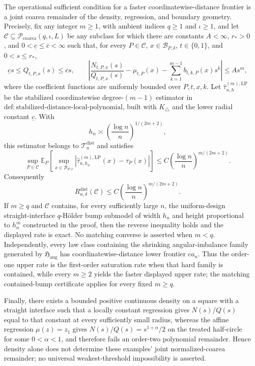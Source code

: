 The operational sufficient condition for a faster coordinatewise-distance frontier is a joint coarea remainder of the density, regression, and boundary geometry.  Precisely, fix any integer \(m\geq1\), with ambient indices \(q\geq1\) and \(\iota\geq1\), and let \(\mathcal C\subseteq\mathcal P_{\mathrm{coarea}}(q,\iota,L)\) be any subclass for which there are constants \(A<\infty\), \(r_*>0\), and \(0<\underline c\leq\overline c<\infty\) such that, for every \(P\in\mathcal C\), \(x\in\mathcal B_{P,\delta}\), \(t\in\{0,1\}\), and \(0<s\leq r_*\),
\[
 \underline c s\leq Q_{t,P,x}(s)\leq\overline c s,
 \qquad
 \left|\frac{N_{t,P,x}(s)}{Q_{t,P,x}(s)}-\mu_{t,P}(x)-\sum_{k=1}^{m-1}b_{t,k,P}(x)s^k\right|\leq As^m,
\]
where the coefficient functions are uniformly bounded over \(P,t,x,k\).  Let \(\widehat\tau^{(m),\mathrm{LP}}_{n,h}\) be the stabilized coordinatewise degree-\((m-1)\) estimator in \(\mathrm{def:stabilized\text{-}distance\text{-}local\text{-}polynomial}\), built with \(K_\triangle\) and the lower radial constant \(\underline c\).  With
\[
 h_n\asymp\left(\frac{\log n}{n}\right)^{1/(2m+2)},
\]
this estimator belongs to \(\mathcal T_n^{\mathrm{dist}}\) and satisfies
\[
 \sup_{P\in\mathcal C}\mathbb E_P\!\left[
 \sup_{x\in\mathcal B_{P,\delta}}
 \left|\widehat\tau^{(m),\mathrm{LP}}_{n,h_n}(x)-\tau_P(x)\right|
 \right]
 \leq C\left(\frac{\log n}{n}\right)^{m/(2m+2)}.
\]
Consequently
\[
 R_{n,\delta}^{\mathrm{dist}}(\mathcal C)
 \leq C\left(\frac{\log n}{n}\right)^{m/(2m+2)}.
\]
If \(m\geq q\) and \(\mathcal C\) contains, for every sufficiently large \(n\), the uniform-design straight-interface \(q\)-H\"older bump submodel of width \(h_n\) and height proportional to \(h_n^m\) constructed in the proof, then the reverse inequality holds and the displayed rate is exact.  No matching converse is asserted when \(m<q\).  Independently, every law class containing the shrinking angular-imbalance family generated by \(\mathfrak H_{\mathrm{ang}}\) has coordinatewise-distance lower frontier \(ca_n\).  Thus the order-one upper rate is the first-order saturation rate when that hard family is contained, while every \(m\geq2\) yields the faster displayed upper rate; the matching contained-bump certificate applies for every fixed \(m\geq q\).

Finally, there exists a bounded positive continuous density on a square with a straight interface such that a locally constant regression gives \(N(s)/Q(s)\) equal to that constant at every sufficiently small radius, whereas the affine regression \(\mu(z)=z_1\) gives \(N(s)/Q(s)=s^{1+\alpha}/2\) on the treated half-circle for some \(0<\alpha<1\), and therefore fails an order-two polynomial remainder.  Hence density alone does not determine these examples' joint normalized-coarea remainder; no universal weakest-threshold impossibility is asserted.